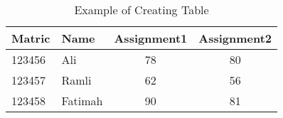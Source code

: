 \documentclass{article}
\begin{document}
\begin{table}
	\centering 
	\caption{Example of Creating Table}
	\begin{tabular}{|l|l|c|c|}
		\hline Matric & Name 	& Assignment1	& Assignment2 	\\ 
		\hline 123456 & Ali 	& 78 			& 80 			\\ 
		\hline 123457 & Ramli 	& 62 			& 56 			\\ 
		\hline 123458 & Fatimah & 90 			& 81 			\\
		\hline
	\end{tabular}
\end{table}
\end{document}
